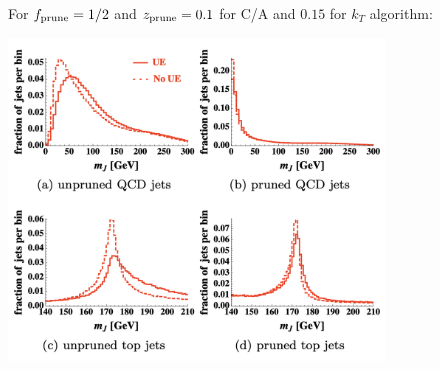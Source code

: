 \documentclass[9pt,a4paper,unknownkeysallowed,xcolor=dvipsnames,aspectratio=43]{beamer}
\begin{document}
\begin{frame}\vspace{2mm}

For $f_{\rm prune}=1/2$ and $z_{\rm prune} = 0.1$ for C/A and $0.15$ for $k_T$ algorithm:
\begin{center}
\includegraphics[width=0.75\textwidth]{05/pruning.png}
\end{center}
\end{frame}
%
%
\end{document}
